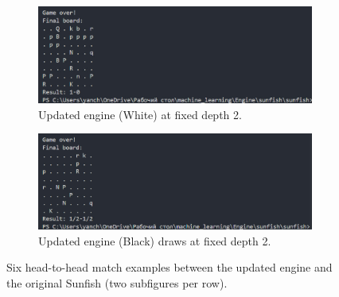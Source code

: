 \documentclass[12pt,a4paper]{article}
\begin{document}
\begin{figure}[H]
    \ContinuedFloat  %
    \centering
    
    \begin{subfigure}[b]{0.49\textwidth}
        \centering
        \includegraphics[width=\textwidth]{figures/yanfishwhitedepth1.png}
        \caption{Updated engine (White) at fixed depth 2.}
        \label{fig:screenshot5}
        
        \vspace{0.5em}
        \small

    \end{subfigure}
    \hfill
    \begin{subfigure}[b]{0.49\textwidth}
        \centering
        \includegraphics[width=\textwidth]{figures/yanfishblackdepth2.png}
        \caption{Updated engine (Black) draws at fixed depth 2.}
        \label{fig:screenshot6}
        
        \vspace{0.5em}
        \small

    \end{subfigure}

    \caption{Six head-to-head match examples between the updated engine and 
             the original Sunfish (two subfigures per row).}
\end{figure}
\end{document}
